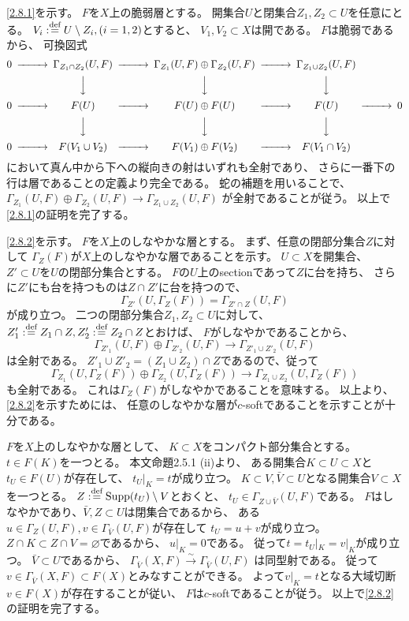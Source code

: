 \documentclass[uplatex,dvipdfmx]{jsarticle}
\makeatletter
\theoremstyle{definition}
\renewenvironment{proof}[1][\proofname]{
  \pushQED{\qed}%
  \normalfont \topsep6\p@\@plus6\p@\relax
  \trivlist
  \item[\hskip\labelsep
    #1\@addpunct{\textbf{.}}]\ignorespaces
}{%
  \popQED\endtrivlist\@endpefalse
}
\providecommand{\proofname}{証明}
\DeclareMathOperator{\Supp}{\mathrm{Supp}}
\renewcommand{\emptyset}{\varnothing}
\def\dfn{:\overset{\mbox{{\scriptsize def}}}{=}}
\makeatother
\begin{document}
\begin{proof}
  \ref{2.8.1}を示す。
  \(F\)を\(X\)上の脆弱層とする。
  開集合\(U\)と閉集合\(Z_1,Z_2\subset U\)を任意にとる。
  \(V_i\dfn U\setminus Z_i, (i=1,2)\)とすると、
  \(V_1,V_2\subset X\)は開である。
  \(F\)は脆弱であるから、
  可換図式
  \[
  \begin{CD}
    0 @>>> \Gamma_{Z_1\cap Z_2}(U,F) @>>>
    \Gamma_{Z_1}(U,F) \oplus \Gamma_{Z_2}(U,F) @>>> \Gamma_{Z_1\cup Z_2}(U,F) @. \\
    @. @VVV @VVV @VVV @. \\
    0 @>>> F(U) @>>> F(U) \oplus F(U) @>>> F(U) @>>> 0 \\
    @. @VVV @VVV @VVV @. \\
    0 @>>> F(V_1\cup V_2) @>>> F(V_1)\oplus F(V_2) @>>> F(V_1\cap V_2) @.
  \end{CD}
  \]
  において真ん中から下への縦向きの射はいずれも全射であり、
  さらに一番下の行は層であることの定義より完全である。
  蛇の補題を用いることで、
  \(\Gamma_{Z_1}(U,F) \oplus \Gamma_{Z_2}(U,F) \to \Gamma_{Z_1\cup Z_2}(U,F)\)
  が全射であることが従う。
  以上で\ref{2.8.1}の証明を完了する。

  \ref{2.8.2}を示す。
  \(F\)を\(X\)上のしなやかな層とする。
  まず、任意の閉部分集合\(Z\)に対して
  \(\Gamma_Z(F)\)が\(X\)上のしなやかな層であることを示す。
  \(U\subset X\)を開集合、
  \(Z'\subset U\)を\(U\)の閉部分集合とする。
  \(F\)の\(U\)上のsectionであって\(Z\)に台を持ち、
  さらに\(Z'\)にも台を持つものは\(Z\cap Z'\)に台を持つので、
  \[
  \Gamma_{Z'}(U,\Gamma_Z(F)) = \Gamma_{Z'\cap Z}(U,F)
  \]
  が成り立つ。
  二つの閉部分集合\(Z_1,Z_2\subset U\)に対して、
  \(Z'_1\dfn Z_1\cap Z, Z'_2\dfn Z_2\cap Z\)とおけば、
  \(F\)がしなやかであることから、
  \[
  \Gamma_{Z'_1}(U,F)\oplus \Gamma_{Z'_2}(U,F) \to \Gamma_{Z'_1\cup Z'_2}(U,F)
  \]
  は全射である。
  \(Z'_1\cup Z'_2 = (Z_1\cup Z_2)\cap Z\)であるので、従って
  \[
  \Gamma_{Z_1}(U,\Gamma_Z(F))\oplus \Gamma_{Z_2}(U,\Gamma_Z(F)) \to
  \Gamma_{Z_1\cup Z_2}(U,\Gamma_Z(F))
  \]
  も全射である。
  これは\(\Gamma_Z(F)\)がしなやかであることを意味する。
  以上より、\ref{2.8.2}を示すためには、
  任意のしなやかな層が\(c\)-softであることを示すことが十分である。

  \(F\)を\(X\)上のしなやかな層として、
  \(K\subset X\)をコンパクト部分集合とする。
  \(t\in F(K)\)を一つとる。
  本文命題2.5.1 (ii)より、
  ある開集合\(K\subset U\subset X\)と\(t_U\in F(U)\)が存在して、
  \(t_U|_K = t\)が成り立つ。
  \(K\subset V, \bar{V}\subset U\)となる開集合\(V\subset X\)を一つとる。
  \(Z\dfn \Supp(t_U)\setminus V\)とおくと、
  \(t_U\in \Gamma_{Z\cup \bar{V}}(U,F)\)である。
  \(F\)はしなやかであり、\(\bar{V},Z\subset U\)は閉集合であるから、
  ある\(u\in \Gamma_Z(U,F), v\in \Gamma_{\bar{V}}(U,F)\)が存在して
  \(t_U = u+v\)が成り立つ。
  \(Z\cap K \subset Z\cap V = \emptyset\)であるから、
  \(u|_K = 0\)である。
  従って\(t = t_U|_K = v|_K\)が成り立つ。
  \(\bar{V}\subset U\)であるから、
  \(\Gamma_{\bar{V}}(X,F) \xrightarrow{\sim} \Gamma_{\bar{V}}(U,F)\)
  は同型射である。
  従って\(v\in \Gamma_{\bar{V}}(X,F)\subset F(X)\)とみなすことができる。
  よって\(v|_K = t\)となる大域切断\(v\in F(X)\)が存在することが従い、
  \(F\)は\(c\)-softであることが従う。
  以上で\ref{2.8.2}の証明を完了する。


\end{proof}
\end{document}
